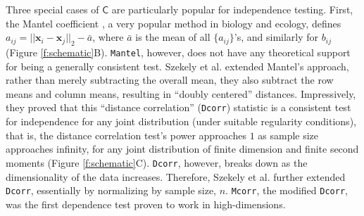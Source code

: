\documentclass[11pt]{article}
\providecommand{\sct}[1]{{\sc \texttt{#1}}}
\providecommand{\mb}[1]{\boldsymbol{#1}}
\newcommand{\G}{\mathsf{C}}
\newcommand{\Dcorr}{\sct{Dcorr}}
\newcommand{\Mcorr}{\sct{Mcorr}}
\newcommand{\Mantel}{\sct{Mantel}}
\newcommand{\mbx}{\ensuremath{\mb{x}}}
\newcommand{\mby}{\ensuremath{\mb{y}}}
\begin{document}
Three special cases of $\G$ are particularly popular for independence testing.  First, the Mantel coefficient \cite{Mantel1967}, a very popular method in biology and ecology, 
defines $a_{ij}=||\mbx_i-\mbx_j||_{2} - \bar{a}$, where $\bar{a}$ is the mean of all $\{a_{ij}\}$'s, and similarly for $b_{ij}$ 
(Figure \ref{f:schematic}B). 
\Mantel, however, does not have any theoretical support for being a generally consistent test. 
Szekely et al. \cite{SzekelyRizzoBakirov2007} extended Mantel's approach, rather than merely subtracting the overall mean, they also subtract the row means and column means, resulting in ``doubly centered'' distances.  Impressively, they proved that this ``distance correlation'' (\Dcorr) statistic is a consistent test for independence for any joint distribution (under suitable regularity conditions), that is, the distance correlation test's power approaches $1$ as sample size approaches infinity, for any joint distribution of finite dimension and finite second moments
(Figure \ref{f:schematic}C). 
\Dcorr, however, breaks down as the dimensionality of the data increases.  Therefore, Szekely et al. \cite{SzekelyRizzo2013a} further extended \Dcorr, essentially by normalizing by sample size,  $n$. 
\Mcorr, the modified \Dcorr, was the first dependence test proven to work in high-dimensions.
\end{document}
